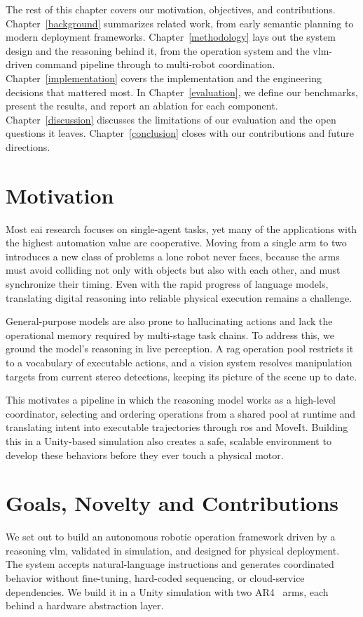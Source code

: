 The rest of this chapter covers our motivation, objectives, and contributions. Chapter~\ref{background} summarizes related work, from early semantic planning to modern deployment frameworks. Chapter~\ref{methodology} lays out the system design and the reasoning behind it, from the operation system and the \gls{vlm}-driven command pipeline through to multi-robot coordination. Chapter~\ref{implementation} covers the implementation and the engineering decisions that mattered most. In Chapter~\ref{evaluation}, we define our benchmarks, present the results, and report an ablation for each component. Chapter~\ref{discussion} discusses the limitations of our evaluation and the open questions it leaves. Chapter~\ref{conclusion} closes with our contributions and future directions.

\section{Motivation}
Most \gls{eai} research focuses on single-agent tasks, yet many of the applications with the highest automation value are cooperative. Moving from a single arm to two introduces a new class of problems a lone robot never faces, because the arms must avoid colliding not only with objects but also with each other, and must synchronize their timing. Even with the rapid progress of language models, translating digital reasoning into reliable physical execution remains a challenge.

General-purpose models are also prone to hallucinating actions and lack the operational memory required by multi-stage task chains. To address this, we ground the model’s reasoning in live perception. A \gls{rag} operation pool restricts it to a vocabulary of executable actions, and a vision system resolves manipulation targets from current stereo detections, keeping its picture of the scene up to date.

This motivates a pipeline in which the reasoning model works as a high-level coordinator, selecting and ordering operations from a shared pool at runtime and translating intent into executable trajectories through \gls{ros} and MoveIt. Building this in a Unity-based simulation also creates a safe, scalable environment to develop these behaviors before they ever touch a physical motor.

\section{Goals, Novelty and Contributions}\label{sec:goals}\label{sec:novelty}
We set out to build an autonomous robotic operation framework driven by a reasoning \gls{vlm}, validated in simulation, and designed for physical deployment. The system accepts natural-language instructions and generates coordinated behavior without fine-tuning, hard-coded sequencing, or cloud-service dependencies. We build it in a Unity simulation with two AR4~\cite{AnninRobotics2026} arms, each behind a hardware abstraction layer.

